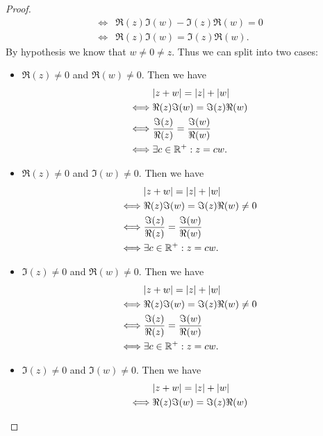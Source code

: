 \begin{proof}
\begin{align*}
    \iff & \Re(z) \Im(w) - \Im(z) \Re(w) = 0                                                                               \\
    \iff & \Re(z) \Im(w) = \Im(z) \Re(w).
  \end{align*}
  By hypothesis we know that \(w \neq 0 \neq z\).
  Thus we can split into two cases:
  \begin{itemize}
    \item \(\Re(z) \neq 0\) and \(\Re(w) \neq 0\).
          Then we have
          \begin{align*}
                 & \abs{z + w} = \abs{z} + \abs{w}                 \\
            \iff & \Re(z) \Im(w) = \Im(z) \Re(w)                   \\
            \iff & \dfrac{\Im(z)}{\Re(z)} = \dfrac{\Im(w)}{\Re(w)} \\
            \iff & \exists c \in \R^+ : z = cw.
          \end{align*}
    \item \(\Re(z) \neq 0\) and \(\Im(w) \neq 0\).
          Then we have
          \begin{align*}
                 & \abs{z + w} = \abs{z} + \abs{w}                 \\
            \iff & \Re(z) \Im(w) = \Im(z) \Re(w) \neq 0            \\
            \iff & \dfrac{\Im(z)}{\Re(z)} = \dfrac{\Im(w)}{\Re(w)} \\
            \iff & \exists c \in \R^+ : z = cw.
          \end{align*}
    \item \(\Im(z) \neq 0\) and \(\Re(w) \neq 0\).
          Then we have
          \begin{align*}
                 & \abs{z + w} = \abs{z} + \abs{w}                 \\
            \iff & \Re(z) \Im(w) = \Im(z) \Re(w) \neq 0            \\
            \iff & \dfrac{\Im(z)}{\Re(z)} = \dfrac{\Im(w)}{\Re(w)} \\
            \iff & \exists c \in \R^+ : z = cw.
          \end{align*}
    \item \(\Im(z) \neq 0\) and \(\Im(w) \neq 0\).
          Then we have
          \begin{align*}
                 & \abs{z + w} = \abs{z} + \abs{w}                 \\
            \iff & \Re(z) \Im(w) = \Im(z) \Re(w)                   \\

\end{align*}
\end{itemize}
\end{proof}
